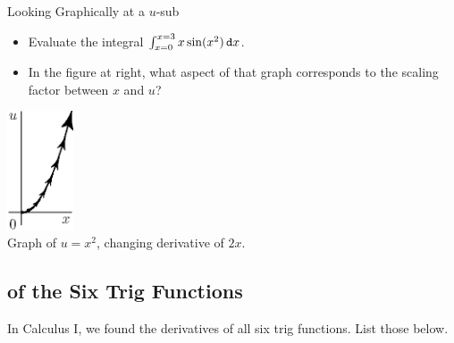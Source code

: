 \begin{exercise}{Looking Graphically at a $u$-sub \Coffeecup \Coffeecup}
\begin{minipage}[l]{.75\textwidth}
\begin{itemize}
\item Evaluate the integral $\int_{x=0}^{x=3}x\sin(x^2)\mathop{}\!\mathtt{d} x$.

\item In the figure at right, what aspect of that graph corresponds to the scaling factor between $x$ and $u$? 

\end{itemize} 
\end{minipage}
 \begin{minipage}[r]{0.2\textwidth}
 	\centering
     \includegraphics[height=100pt]{ChapterAntidiff/Figures/utoxsquared.eps} \\
     Graph of $u=x^2$, changing derivative of $2x$.
 \end{minipage}
 
 
\end{exercise}

\subsection{ of the Six Trig Functions}\label{SixTrigAntiderivatives}

In Calculus I, we found the derivatives of all six trig functions.  List those below.

